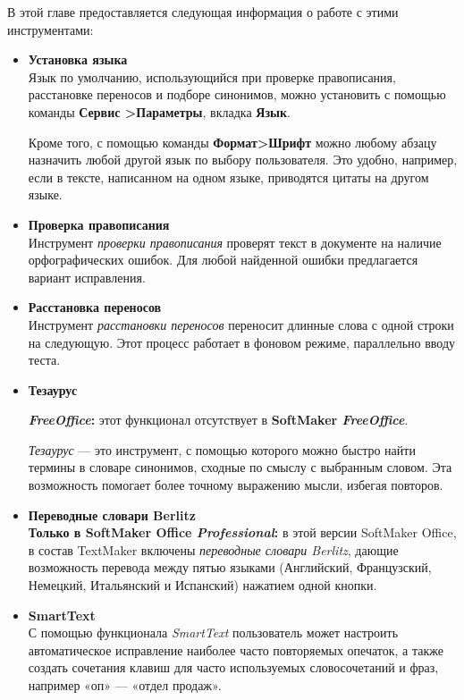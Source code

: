 ﻿\documentclass[a4paper,10pt]{article}
\begin{document}
В этой главе предоставляется следующая информация о работе с этими инструментами:

\begin{itemize}
 \item \textbf{Установка языка}\\
 Язык по умолчанию, использующийся при проверке правописания, расстановке переносов и подборе синонимов, можно установить с помощью команды \textbf{Сервис >Параметры}, вкладка \textbf{Язык}.
 
 Кроме того, с помощью команды \textbf{Формат>Шрифт} можно любому абзацу назначить любой другой язык по выбору пользователя. Это удобно, например, если в тексте, написанном на одном языке, приводятся цитаты на другом языке.
 \item \textbf{Проверка правописания}\\
 Инструмент \textit{проверки правописания} проверят текст в документе на наличие орфографических ошибок. Для любой найденной ошибки предлагается вариант исправления.
 \item \textbf{Расстановка переносов}\\
 Инструмент \textit{расстановки переносов} переносит длинные слова с одной строки на следующую. Этот процесс работает в фоновом режиме, параллельно вводу теста.
 \item \textbf{Тезаурус}\\
 \begin{mdframed}[backgroundcolor=pink!50]
\textbf{\textit{FreeOffice}:} этот функционал отсутствует в \textbf{SoftMaker \textit{FreeOffice}}.
\end{mdframed}
\textit{Тезаурус} — это инструмент, с помощью которого можно быстро найти термины в словаре синонимов, сходные по смыслу с выбранным словом. Эта возможность помогает более точному выражению мысли, избегая повторов.
\item \textbf{Переводные словари Berlitz}\\
\textbf{Только в SoftMaker Office \textit{Professional}:} в этой версии SoftMaker Office, в состав TextMaker включены \textit{переводные словари Berlitz}, дающие возможность перевода между пятью языками (Английский, Французский, Немецкий, Итальянский и Испанский) нажатием одной кнопки.
\item \textbf{SmartText}\\
С помощью функционала \textit{SmartText} пользователь может настроить автоматическое исправление наиболее часто повторяемых опечаток, а также создать сочетания клавиш для часто используемых словосочетаний и фраз, например «оп» — «отдел продаж».
\end{itemize}
\end{document}
